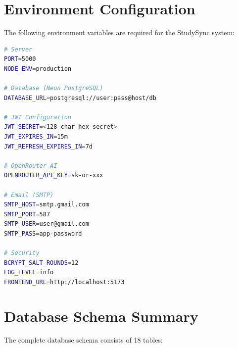 \documentclass[12pt,a4paper]{report}
\begin{document}
\chapter{Environment Configuration}

The following environment variables are required for the StudySync system:

\begin{lstlisting}[language=bash, caption={Environment Configuration (.env)}]
# Server
PORT=5000
NODE_ENV=production

# Database (Neon PostgreSQL)
DATABASE_URL=postgresql://user:pass@host/db

# JWT Configuration
JWT_SECRET=<128-char-hex-secret>
JWT_EXPIRES_IN=15m
JWT_REFRESH_EXPIRES_IN=7d

# OpenRouter AI
OPENROUTER_API_KEY=sk-or-xxx

# Email (SMTP)
SMTP_HOST=smtp.gmail.com
SMTP_PORT=587
SMTP_USER=user@gmail.com
SMTP_PASS=app-password

# Security
BCRYPT_SALT_ROUNDS=12
LOG_LEVEL=info
FRONTEND_URL=http://localhost:5173
\end{lstlisting}

\chapter{Database Schema Summary}

The complete database schema consists of 18 tables:
\end{document}
